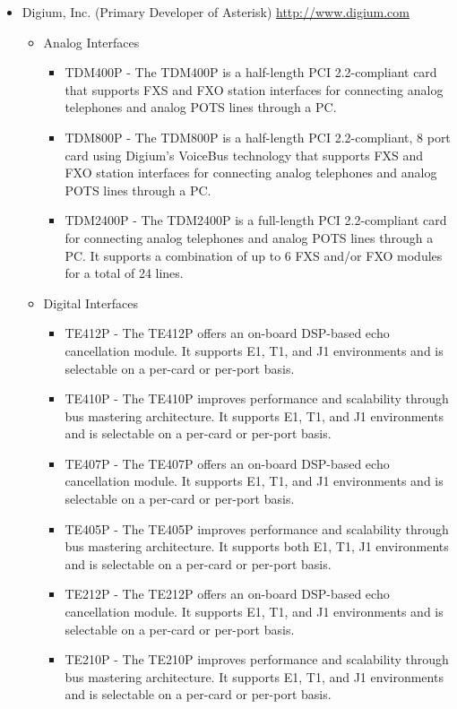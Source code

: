 \begin{itemize}
\item Digium, Inc. (Primary Developer of Asterisk)
      \url{http://www.digium.com}
  \begin{itemize}
     \item Analog Interfaces
     \begin{itemize}
       \item TDM400P - The TDM400P is a half-length PCI 2.2-compliant card that supports FXS and FXO station interfaces for connecting analog telephones and analog POTS lines through a PC.
       \item TDM800P - The TDM800P is a half-length PCI 2.2-compliant, 8 port card using Digium's VoiceBus technology that supports FXS and FXO station interfaces for connecting analog telephones and analog POTS lines through a PC.
       \item TDM2400P - The TDM2400P is a full-length PCI 2.2-compliant card for connecting analog telephones and analog POTS lines through a PC. It supports a combination of up to 6 FXS and/or FXO modules for a total of 24 lines.
     \end{itemize}
     \item Digital Interfaces
     \begin{itemize}
       \item TE412P - The TE412P offers an on-board DSP-based echo cancellation module. It supports E1, T1, and J1 environments and is selectable on a per-card or per-port basis.
       \item TE410P - The TE410P improves performance and scalability through bus mastering architecture. It supports E1, T1, and J1 environments and is selectable on a per-card or per-port basis.
       \item TE407P - The TE407P offers an on-board DSP-based echo cancellation module. It supports E1, T1, and J1 environments and is selectable on a per-card or per-port basis.
       \item TE405P - The TE405P improves performance and scalability through bus mastering architecture. It supports both E1, T1, J1 environments and is selectable on a per-card or per-port basis.
       \item TE212P - The TE212P offers an on-board DSP-based echo cancellation module. It supports E1, T1, and J1 environments and is selectable on a per-card or per-port basis.
       \item TE210P - The TE210P improves performance and scalability through bus mastering architecture. It supports E1, T1, and J1 environments and is selectable on a per-card or per-port basis.

\end{itemize}
\end{itemize}
\end{itemize}
